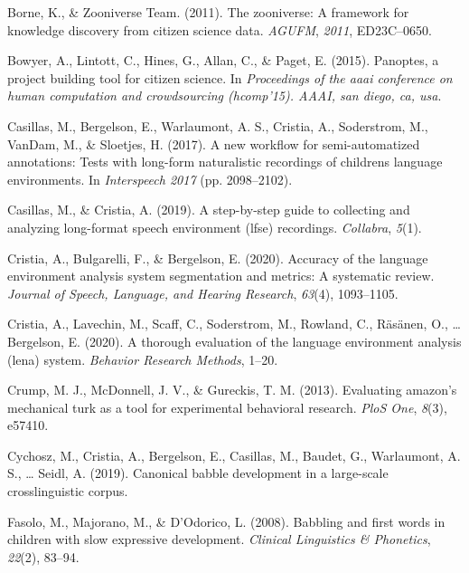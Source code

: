 \documentclass[english,,man,floatsintext]{apa6}
\begin{document}
\leavevmode\hypertarget{ref-borne2011zooniverse}{}%
Borne, K., \& Zooniverse Team. (2011). The zooniverse: A framework for knowledge discovery from citizen science data. \emph{AGUFM}, \emph{2011}, ED23C--0650.

\leavevmode\hypertarget{ref-bowyer2015panoptes}{}%
Bowyer, A., Lintott, C., Hines, G., Allan, C., \& Paget, E. (2015). Panoptes, a project building tool for citizen science. In \emph{Proceedings of the aaai conference on human computation and crowdsourcing (hcomp'15). AAAI, san diego, ca, usa}.

\leavevmode\hypertarget{ref-casillas2017new}{}%
Casillas, M., Bergelson, E., Warlaumont, A. S., Cristia, A., Soderstrom, M., VanDam, M., \& Sloetjes, H. (2017). A new workflow for semi-automatized annotations: Tests with long-form naturalistic recordings of childrens language environments. In \emph{Interspeech 2017} (pp. 2098--2102).

\leavevmode\hypertarget{ref-casillas2019step}{}%
Casillas, M., \& Cristia, A. (2019). A step-by-step guide to collecting and analyzing long-format speech environment (lfse) recordings. \emph{Collabra}, \emph{5}(1).

\leavevmode\hypertarget{ref-cristia2020accuracy}{}%
Cristia, A., Bulgarelli, F., \& Bergelson, E. (2020). Accuracy of the language environment analysis system segmentation and metrics: A systematic review. \emph{Journal of Speech, Language, and Hearing Research}, \emph{63}(4), 1093--1105.

\leavevmode\hypertarget{ref-cristia2020thorough}{}%
Cristia, A., Lavechin, M., Scaff, C., Soderstrom, M., Rowland, C., Räsänen, O., \ldots{} Bergelson, E. (2020). A thorough evaluation of the language environment analysis (lena) system. \emph{Behavior Research Methods}, 1--20.

\leavevmode\hypertarget{ref-crump2013evaluating}{}%
Crump, M. J., McDonnell, J. V., \& Gureckis, T. M. (2013). Evaluating amazon's mechanical turk as a tool for experimental behavioral research. \emph{PloS One}, \emph{8}(3), e57410.

\leavevmode\hypertarget{ref-cychosz2019canonical}{}%
Cychosz, M., Cristia, A., Bergelson, E., Casillas, M., Baudet, G., Warlaumont, A. S., \ldots{} Seidl, A. (2019). Canonical babble development in a large-scale crosslinguistic corpus.

\leavevmode\hypertarget{ref-fasolo2008babbling}{}%
Fasolo, M., Majorano, M., \& D'Odorico, L. (2008). Babbling and first words in children with slow expressive development. \emph{Clinical Linguistics \& Phonetics}, \emph{22}(2), 83--94.
\end{document}
